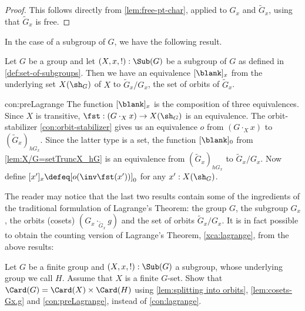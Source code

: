 \begin{proof}
This follows directly from \cref{lem:free-pt-char}, 
applied to $G_x$ and $\tilde G_x$, using that $\tilde G_x$ is free.
\end{proof}

In the case of a subgroup of $G$, we have the following result.

\begin{construction}\label{con:preLagrange}
  Let $G$ be a group and let $(X,x,!):\Sub(G)$ be a subgroup of $G$ as defined
  in \cref{def:set-of-subgroups}. Then we have an equivalence
  $[\blank]_x$ from the underlying set $X(\sh_G)$ of $X$ to 
  $\tilde G_x /G_x$, the set of orbits of $\tilde G_x$. 
\end{construction}
\begin{implementation}{con:preLagrange}
The function $[\blank]_x$ is the composition of three equivalences.
Since $X$ is transitive, $\fst: (G\cdot_X x)\to X(\sh_G)$ is an equivalence.
The orbit-stabilizer \cref{con:orbit-stabilizer} gives us an equivalence $o$
from $(G\cdot_X x)$ to $(\tilde G_x)_{hG_x}$. Since the latter type is a set,
the function $[\blank]_0$ from \cref{lem:X/G=setTruncX_hG} 
is an equivalence from $(\tilde G_x)_{hG_x}$ to $\tilde G_x /G_x$.
Now define $[x']_x \defeq [o(\inv\fst(x'))]_0$ for any $x':X(\sh_G)$.
\end{implementation}

The reader may notice that the last two results contain some of
the ingredients of the traditional formulation of Lagrange's Theorem:
the group $G$, the subgroup $G_x$, the orbits 
(cosets) $(G_x \cdot_{\tilde G_x} g)$ 
and the set of orbits $\tilde G_x /G_x$.
It is in fact possible to obtain the counting version of
Lagrange's Theorem, \cref{xca:lagrange}, from the above results:

\begin{xca}\label{xca:lagrange2}
Let $G$ be a finite group and $(X,x,!):\Sub(G)$ a subgroup,
whose underlying group we call $H$. 
Assume that $X$ is a finite $G$-set. Show that 
$\Card(G) = \Card(X) \times \Card(H)$ using \cref{lem:splitting into orbits},
\cref{lem:cosets-Gx.g} and \cref{con:preLagrange}, instead of
\cref{con:lagrange}.
\end{xca}


